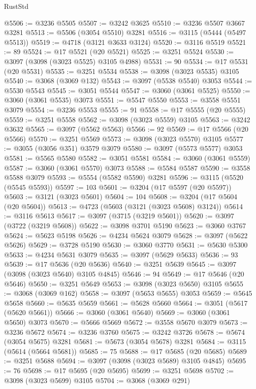 \begin{lexlean}{RustStd}
\begin{coremodule}
@5506 := @3236 @5505
@5507 := @3242 @3625
@5510 := @3236 @5507 @3667 @3281
@5513 := @5506 (@3054 @5510) @3281
@5516 := @3115 (@5444 (@5497 @5513))
@5519 := @4718 (@3121 @3633 @3124)
@5520 := @3116 @5519
@5521 := 89
@5524 := @17 @5521 (@20 @5521)
@5525 := @3251 @5524
@5530 := @3097 (@3098 (@3023 @5525) @3105 @4988)
@5531 := 90
@5534 := @17 @5531 (@20 @5531)
@5535 := @3251 @5534
@5538 := @3098 (@3023 @5535) @3105
@5540 := @3068 (@3069 @132)
@5543 := @3097 (@5538 @5540) @3053
@5544 := @5530 @5543
@5545 := @3051 @5544
@5547 := @3060 (@3061 @5525)
@5550 := @3060 (@3061 @5535) @3073
@5551 := @5547 @5550
@5553 := @3558 @5551 @3079
@5554 := @3236 @5553
@5555 := 91
@5558 := @17 @5555 (@20 @5555)
@5559 := @3251 @5558
@5562 := @3098 (@3023 @5559) @3105
@5563 := @3242 @3632
@5565 := @3097 (@5562 @5563)
@5566 := 92
@5569 := @17 @5566 (@20 @5566)
@5570 := @3251 @5569
@5573 := @3098 (@3023 @5570) @3105
@5577 := @3055 (@3056 @351) @3579 @3079
@5580 := @3097 (@5573 @5577) @3053
@5581 := @5565 @5580
@5582 := @3051 @5581
@5584 := @3060 (@3061 @5559)
@5587 := @3060 (@3061 @5570) @3073
@5588 := @5584 @5587
@5590 := @3558 @5588 @3079
@5593 := @5554 (@5582 @5590) @3281
@5596 := @3115 (@5520 (@5545 @5593))
@5597 := 103
@5601 := @3204 (@17 @5597 (@20 @5597))
@5603 := @3121 (@3023 @5601)
@5604 := 104
@5608 := @3204 (@17 @5604 (@20 @5604))
@5613 := @4723 (@5603 (@3121 (@3023 @5608) @3124))
@5614 := @3116 @5613
@5617 := @3097 (@3715 (@3219 @5601))
@5620 := @3097 (@3722 (@3219 @5608))
@5622 := @3098 @3701 @5190
@5623 := @3060 @3767
@5624 := @5623 @5198
@5626 := @4234 @5624 @3079
@5628 := @3097 (@5622 @5626)
@5629 := @3728 @5190
@5630 := @3060 @3770
@5631 := @5630 @5300
@5633 := @4234 @5631 @3079
@5635 := @3097 (@5629 @5633)
@5636 := 93
@5639 := @17 @5636 (@20 @5636)
@5640 := @3251 @5639
@5645 := @3097 (@3098 (@3023 @5640) @3105 @4845)
@5646 := 94
@5649 := @17 @5646 (@20 @5646)
@5650 := @3251 @5649
@5653 := @3098 (@3023 @5650) @3105
@5655 := @3068 (@3069 @162)
@5658 := @3097 (@5653 @5655) @3053
@5659 := @5645 @5658
@5660 := @5635 @5659
@5661 := @5628 @5660
@5664 := @3051 (@5617 (@5620 @5661))
@5666 := @3060 (@3061 @5640)
@5669 := @3060 (@3061 @5650) @3073
@5670 := @5666 @5669
@5672 := @3558 @5670 @3079
@5673 := @3236 @5672
@5674 := @3236 @3760
@5675 := @3242 @3726
@5678 := @5674 (@3054 @5675) @3281
@5681 := @5673 (@3054 @5678) @3281
@5684 := @3115 (@5614 (@5664 @5681))
@5685 := 75
@5688 := @17 @5685 (@20 @5685)
@5689 := @3251 @5688
@5694 := @3097 (@3098 (@3023 @5689) @3105 @4845)
@5695 := 76
@5698 := @17 @5695 (@20 @5695)
@5699 := @3251 @5698
@5702 := @3098 (@3023 @5699) @3105
@5704 := @3068 (@3069 @291)

\end{coremodule}
\end{lexlean}
